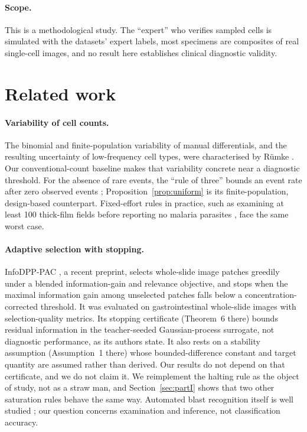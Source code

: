 \documentclass[11pt]{article}
\theoremstyle{remark}
\theoremstyle{definition}
\begin{document}
\paragraph{Scope.} This is a methodological study. The ``expert'' who verifies sampled cells is simulated with the datasets' expert labels, most specimens are composites of real single-cell images, and no result here establishes clinical diagnostic validity.

\section{Related work}
\paragraph{Variability of cell counts.} The binomial and finite-population variability of manual differentials, and the resulting uncertainty of low-frequency cell types, were characterised by R\"umke \cite{rumke1978}. Our conventional-count baseline makes that variability concrete near a diagnostic threshold. For the absence of rare events, the ``rule of three'' bounds an event rate after zero observed events \cite{hanley1983}; Proposition~\ref{prop:uniform} is its finite-population, design-based counterpart. Fixed-effort rules in practice, such as examining at least 100 thick-film fields before reporting no malaria parasites \cite{who2016malariasop}, face the same worst case.

\paragraph{Adaptive selection with stopping.} InfoDPP-PAC \cite{mittal2026infodpp}, a recent preprint, selects whole-slide image patches greedily under a blended information-gain and relevance objective, and stops when the maximal information gain among unselected patches falls below a concentration-corrected threshold. It was evaluated on gastrointestinal whole-slide images with selection-quality metrics. Its stopping certificate (Theorem~6 there) bounds residual information in the teacher-seeded Gaussian-process surrogate, not diagnostic performance, as its authors state. It also rests on a stability assumption (Assumption~1 there) whose bounded-difference constant and target quantity are assumed rather than derived. Our results do not depend on that certificate, and we do not claim it. We reimplement the halting rule as the object of study, not as a straw man, and Section~\ref{sec:partI} shows that two other saturation rules behave the same way. Automated blast recognition itself is well studied \cite{matek2019aml}; our question concerns examination and inference, not classification accuracy.
\end{document}
